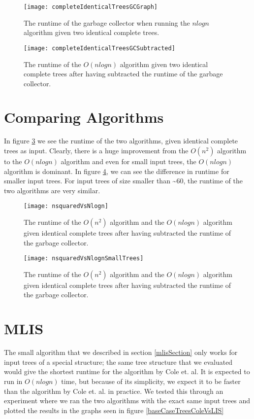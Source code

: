 \begin{figure}
	\texttt{[image: completeIdenticalTreesGCGraph]}
	\caption{The runtime of the garbage collector when running the $nlogn$ algorithm given two identical complete trees.}
	\label{completeIdenticalTreesGCGraph}
\end{figure}
\begin{figure}
	\texttt{[image: completeIdenticalTreesGCSubtracted]}
	\caption{The runtime of the $O(nlogn)$ algorithm given two identical complete trees after having subtracted the runtime of the garbage collector.}
	\label{completeIdenticalTreesGCSubtractedGraph}
\end{figure}

\section{Comparing Algorithms}
In figure \ref{nsquaredVsNlognGraph} we see the runtime of the two algorithms, given identical complete trees as input. Clearly, there is a huge improvement from the $O(n^2)$ algorithm to the $O(nlogn)$ algorithm and even for small input trees, the $O(nlogn)$ algorithm is dominant. In figure \ref{nsquaredVsNlognSmallTreesGraph}, we can see the difference in runtime for smaller input trees. For input trees of size smaller than \textasciitilde 60, the runtime of the two algorithms are very similar.

\begin{figure}
	\texttt{[image: nsquaredVsNlogn]}
	\caption{The runtime of the $O(n^2)$ algorithm and the $O(nlogn)$ algorithm given identical complete trees after having subtracted the runtime of the garbage collector.}
	\label{nsquaredVsNlognGraph}
\end{figure}
\begin{figure}
	\texttt{[image: nsquaredVsNlognSmallTrees]}
	\caption{The runtime of the $O(n^2)$ algorithm and the $O(nlogn)$ algorithm given identical complete trees after having subtracted the runtime of the garbage collector.}
	\label{nsquaredVsNlognSmallTreesGraph}
\end{figure}

\section{MLIS}
The small algorithm that we described in section \ref{mlisSection} only works for input trees of a special structure; the same tree structure that we evaluated would give the shortest runtime for the algorithm by Cole et. al. It is expected to run in $O(nlogn)$ time, but because of its simplicity, we expect it to be faster than the algorithm by Cole et. al. in practice. We tested this through an experiment where we ran the two algorithms with the exact same input trees and plotted the results in the graphs seen in figure \ref{baseCaseTreesColeVsLIS}

